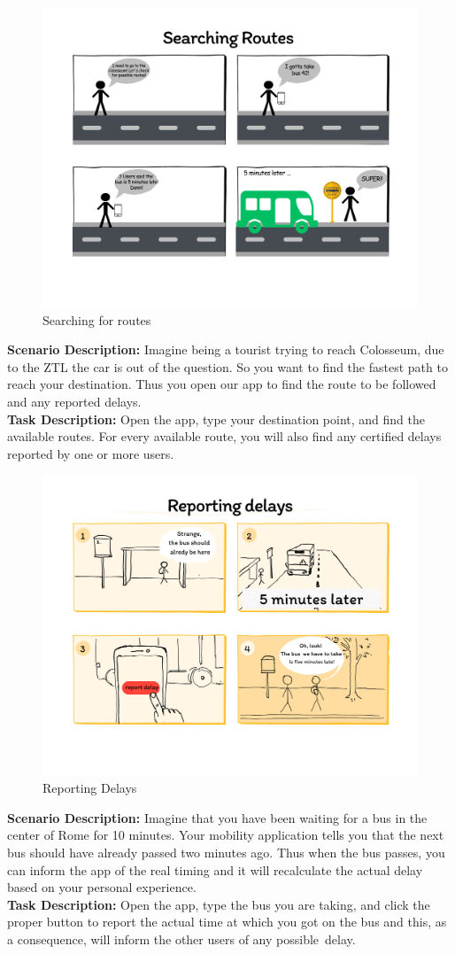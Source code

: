 \documentclass[a4paper, 11pt]{report}
\begin{document}
\begin{figure}[H]
	\centering	
	\includegraphics[width=.5\textwidth]{img/storyboards/storyboard_searching_routes.png}
	\caption{Searching for routes}
	\label{fig:a}
\end{figure}	
\textbf{Scenario Description:} Imagine being a tourist trying to reach Colosseum,
 due to the ZTL the car is out of the question. So you want to find the fastest
  path to reach your destination. Thus you open our app to find the route to be followed and any reported delays.    \\
\textbf{Task Description:} Open the app, type your destination point,
 and find the available routes. For every available route, you will also find any certified delays
 reported by one or more users.\\
\begin{figure}[H]	 
	\centering
	\includegraphics [width=.5\textwidth]{img/storyboards/storyboard_reporting_delays.png}
	\caption{Reporting Delays}
	\label{fig:b}
\end{figure}

\textbf{Scenario Description:} Imagine that you have been waiting
for a bus in the center of Rome for 10 minutes. Your mobility application tells you
 that the next bus should have already passed two minutes ago.
  Thus when the bus passes, you can inform the app of the real timing and it will recalculate the actual
   delay based on your personal experience.    \\
\textbf{Task Description:} Open the app, type the bus you are taking, and click the proper button
 to report the actual time at which you got on the bus and this, as a consequence,
  will inform the other users of any possible delay.\\
\end{document}

